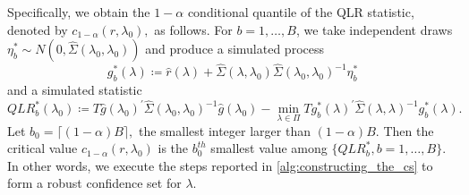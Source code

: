 \documentclass[11pt, letterpaper, twoside]{article}
\begin{document}
Specifically, we obtain the $1-\alpha $ conditional quantile of the QLR statistic, denoted by $c_{1-\alpha }(r,\lambda _{0}),$ as follows. For $ b=1,\ldots,B$, we take independent draws $\eta _{b}^{\ast }\sim N(0,\widehat{\Sigma }(\lambda _{0},\lambda _{0}))$ and produce a simulated process 
%
\begin{equation}
    g_{b}^{\ast }(\lambda ) \coloneqq \widehat{r}(\lambda )+\widehat{\Sigma }(\lambda ,\lambda _{0})\widehat{\Sigma }(\lambda _{0},\lambda _{0})^{-1}\eta _{b}^{\ast }
\end{equation}
%
and a simulated statistic
%
\begin{equation}
    QLR_{b}^{\ast }(\lambda _{0}) \coloneqq T\widehat{g}(\lambda _{0})^{\prime }\widehat{\Sigma }(\lambda _{0},\lambda _{0})^{-1}\widehat{g}(\lambda _{0})-\underset{\lambda \in \Pi }{\min }Tg_{b}^{\ast }(\lambda )^{\prime }\widehat{\Sigma } (\lambda ,\lambda )^{-1}g_{b}^{\ast }(\lambda ).
\end{equation}
%
Let $b_{0}=\lceil (1-\alpha )B\rceil ,$ the smallest integer larger than $(1-\alpha )B$. Then the critical value $c_{1-\alpha }(r,\lambda _{0})$ is the $b_{0}^{th}$ smallest value among $\{QLR_{b}^{\ast },b=1,\ldots,B\}$.
In other words, we execute the steps reported in \cref{alg:constructing_the_cs} to form a robust confidence set for $\lambda$.
\end{document}
